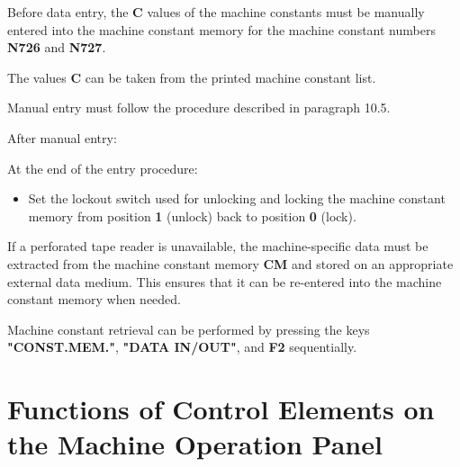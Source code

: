 \procedure

Before data entry, the \textbf{C} values of the machine constants must be manually entered into the machine constant memory for the machine constant numbers \textbf{N726} and \textbf{N727}.

The values \textbf{C} can be taken from the printed machine constant list.

Manual entry must follow the procedure described in paragraph 10.5.

After manual entry:

\begin{itemize}
\end{itemize}

\vspace{.5cm}

\begin{itemize}
\end{itemize}
\vspace{1cm}
At the end of the entry procedure:

\begin{itemize}
    \item Set the lockout switch used for unlocking and locking the machine constant memory from position \textbf{1} (unlock) back to position \textbf{0} (lock).
\end{itemize}


\notes

If a perforated tape reader is unavailable, the machine-specific data must be extracted from the machine constant memory \textbf{CM} and stored on an appropriate external data medium. This ensures that it can be re-entered into the machine constant memory when needed.

Machine constant retrieval can be performed by pressing the keys \textbf{"CONST.MEM."}, \textbf{"DATA IN/OUT"}, and \textbf{F2} sequentially.

\newpage
\setcounter{section}{6}
\section{Functions of Control Elements on the Machine Operation Panel}

